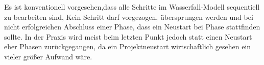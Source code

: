 Es ist konventionell vorgesehen,dass alle Schritte im Wasserfall-Modell sequentiell zu bearbeiten sind, \dahe Kein Schritt darf vorgezogen, übersprungen werden und bei nicht erfolgreichen Abschluss einer Phase, dass ein Neustart bei Phase stattfinden sollte. In der Praxis wird meist beim letzten Punkt jedoch statt einen Neustart eher Phasen zurückgegangen, da ein Projektneustart wirtschaftlich gesehen ein vieler größer Aufwand wäre.




